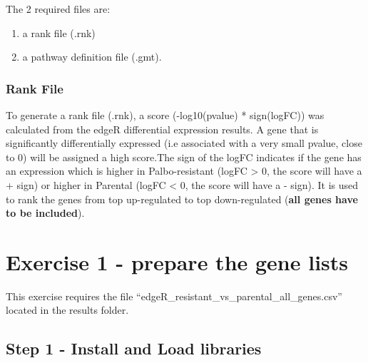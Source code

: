 \documentclass[
]{book}
\providecommand{\tightlist}{%
  \setlength{\itemsep}{0pt}\setlength{\parskip}{0pt}}
\begin{document}
The 2 required files are:

\begin{enumerate}
\def\labelenumi{\arabic{enumi}.}
\tightlist
\item
  a rank file (.rnk)
\item
  a pathway definition file (.gmt).
\end{enumerate}

\subsubsection{Rank File}\label{rank-file}

To generate a rank file (.rnk), a score (-log10(pvalue) * sign(logFC)) was calculated from the edgeR differential expression results. A gene that is significantly differentially expressed (i.e associated with a very small pvalue, close to 0) will be assigned a high score.The sign of the logFC indicates if the gene has an expression which is higher in Palbo-resistant (logFC \textgreater{} 0, the score will have a + sign) or higher in Parental (logFC \textless{} 0, the score will have a - sign). It is used to rank the genes from top up-regulated to top down-regulated (\textbf{all genes have to be included}).

\section{Exercise 1 - prepare the gene lists}\label{exercise-1-ranked}

This exercise requires the file ``edgeR\_resistant\_vs\_parental\_all\_genes.csv'' located in the results folder.

\subsection{Step 1 - Install and Load libraries}\label{step-1---install-and-load-libraries-1}
\end{document}
